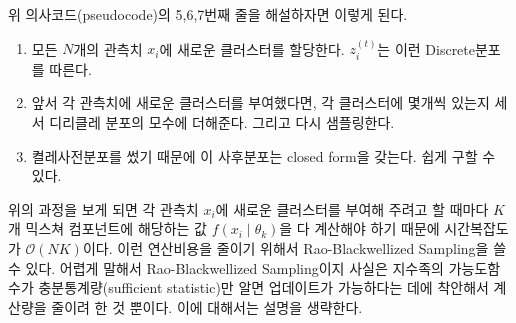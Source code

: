 \documentclass[a4paper, 10pt]{book}
\begin{document}
    위 의사코드(pseudocode)의 5,6,7번째 줄을 해설하자면 이렇게 된다.
    \begin{enumerate}
      \item 모든 $N$개의 관측치 $x_{i}$에 새로운 클러스터를 할당한다. $z_{i}^{\left(t\right)}$는 이런 Discrete분포를 따른다.
      \item 앞서 각 관측치에 새로운 클러스터를 부여했다면, 각 클러스터에 몇개씩 있는지 세서 디리클레 분포의 모수에 더해준다. 그리고 다시 샘플링한다.
      \item 켤레사전분포를 썼기 때문에 이 사후분포는 closed form을 갖는다. 쉽게 구할 수 있다.
    \end{enumerate}

    위의 과정을 보게 되면 각 관측치 $x_{i}$에 새로운 클러스터를 부여해 주려고 할 때마다 $K$개 믹스쳐 컴포넌트에 해당하는 값 $f\left(x_{i}\;|\;\theta_{k}\right)$을 다 계산해야 하기 때문에 시간복잡도가 $\mathcal{O}\left(NK\right)$이다. 이런 연산비용을 줄이기 위해서 Rao-Blackwellized Sampling을 쓸 수 있다. 어렵게 말해서 Rao-Blackwellized Sampling이지 사실은 지수족의 가능도함수가 충분통계량(sufficient statistic)만 알면 업데이트가 가능하다는 데에 착안해서 계산량을 줄이려 한 것 뿐이다. 이에 대해서는 설명을 생략한다.
\end{document}
